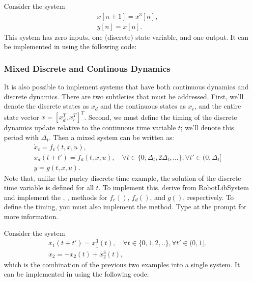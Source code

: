 \begin{example}
Consider the system \begin{gather*}x[n+1] = x^3[n],\\ y[n] = x[n].\end{gather*}  This system has zero inputs, one (discrete) state variable, and one output.  It can be implemented in \robotlib using the following code:

\end{example}


\subsubsection{Mixed Discrete and Continous Dynamics}

It is also possible to implement systems that have both continuous
dynamics and discrete dynamics.  There are two subtleties that must be
addressed.  First, we'll denote the discrete states as $x_d$ and the
continuous states as $x_c$, and the entire state vector $x = [x_d^T,
x_c^T]^T$.  Second, we must define the timing of the discrete dynamics
update relative to the continuous time variable $t$; we'll denote this
period with $\Delta_t$.  Then a mixed system can be written
as:\begin{gather*} \dot{x}_c = f_c(t,x,u),\\ x_d(t+t') = f_d(t,x,u),
  \quad \forall t \in \{0,\Delta_t,2\Delta_t,...\},\forall t' \in
  (0,\Delta_t] \\ y=g(t,x,u). \end{gather*} Note that, unlike the
purley discrete time example, the solution of the discrete time variable is defined
for all $t$.  To implement this, derive from RobotLibSystem and
implement the , ,  methods
for $f_c()$, $f_d()$, and $g()$, respectively.  To define the timing,
you must also implement the  method.  Type
 at the \matlab prompt for
more information.

\begin{example}
Consider the system \begin{gather*}x_1(t+t') = x_1^3(t), \quad \forall
  t \in \{0,1,2,..\}, \forall t' \in (0,1], \\\dot{x}_2 =
  -x_2(t) + x_2^3(t), \end{gather*} which is the combination of the
previous two examples into a single system.  It can be implemented in \robotlib using the following code:

\end{example}

